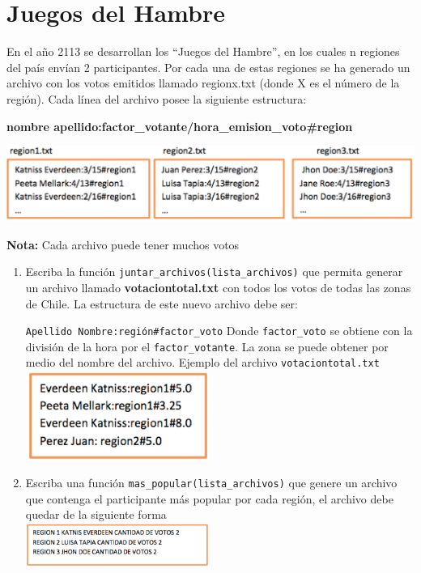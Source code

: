 \section{Juegos del Hambre}
En el año 2113 se desarrollan los “Juegos del Hambre”, en los cuales n regiones del país envían 2 participantes. Por cada una de estas regiones se ha generado un archivo con los votos emitidos llamado regionx.txt (donde X es el número de la región). Cada línea del archivo posee la siguiente estructura:

\textbf{nombre apellido:factor\_votante/hora\_emision\_voto\#region}

%
\includegraphics[width=15cm]{Images/i2-1.png}

\textbf{Nota:} Cada archivo puede tener muchos votos



\begin{enumerate}
    \item Escriba la función \texttt{juntar\_archivos(lista\_archivos)} que permita generar un archivo llamado \textbf{votaciontotal.txt} con todos los votos de todas las zonas de Chile. La estructura de este nuevo archivo debe ser:
    
    \texttt{Apellido Nombre:región\#factor\_voto}
    Donde \texttt{factor\_voto} se obtiene con la división de la hora por el \texttt{factor\_votante}. La zona se puede obtener por medio del nombre del archivo.
    Ejemplo del archivo \texttt{votaciontotal.txt}\\
    \includegraphics[width=6cm]{Images/i2-2.png}

    \item Escriba una función \texttt{mas\_popular(lista\_archivos)} que genere un archivo que contenga el participante más popular por cada región, el archivo debe quedar de la siguiente forma\\
    \includegraphics[width=6cm]{Images/i2-3.png}
\end{enumerate}

